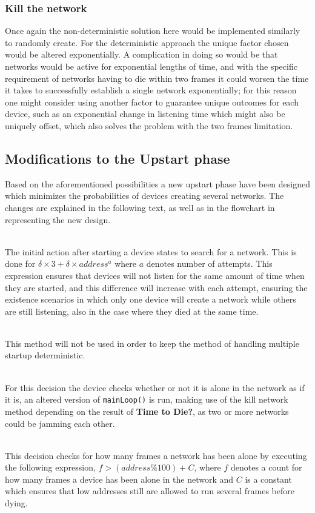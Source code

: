 \subsubsection*{Kill the network}
Once again the non-deterministic solution here would be implemented similarly to randomly create.
For the deterministic approach the unique factor chosen would be altered exponentially.
A complication in doing so would be that networks would be active for exponential lengths of time, and with the specific requirement of networks having to die within two frames it could worsen the time it takes to successfully establish a single network exponentially; for this reason one might consider using another factor to guarantee unique outcomes for each device, such as an exponential change in listening time which might also be uniquely offset, which also solves the problem with the two frames limitation.

\subsection{Modifications to the Upstart phase}
Based on the aforementioned possibilities a new upstart phase have been designed which minimizes the probabilities of devices creating several networks.
The changes are explained in the following text, as well as in the flowchart in  representing the new design.

\begin{description}[labelindent=\parindent]
    \item[Search for network]\hfill\\
    The initial action after starting a device states to search for a network.
This is done for $\delta \times 3 + \delta \times address^a$ where $a$ denotes number of attempts. 
This expression ensures that devices will not listen for the same amount of time when they are started, and this difference will increase with each attempt, ensuring the existence scenarios in which only one device will create a network while others are still listening, also in the case where they died at the same time.
    \item[Chance of creating a network]\hfill\\
    This method will not be used in order to keep the method of handling multiple startup deterministic.
    \item[Alone in network?]\hfill\\
    For this decision the device checks whether or not it is alone in the network as if it is, an altered version of \texttt{mainLoop()} is run, making use of the kill network method depending on the result of \textbf{Time to Die?}, as two or more networks could be jamming each other.
    \item[Time to Die?]\hfill\\
    This decision checks for how many frames a network has been alone by executing the following expression, $f > (address \% 100) + C$, where $f$ denotes a count for how many frames a device has been alone in the network and $C$ is a constant which ensures that low addresses still are allowed to run several frames before dying.
\end{description}


